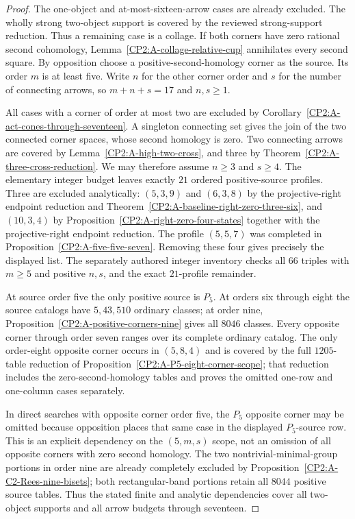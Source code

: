 \begin{proof}
The one-object and at-most-sixteen-arrow cases are already
excluded. The wholly strong two-object support is covered
by the reviewed strong-support reduction. Thus a remaining
case is a collage. If both corners have zero rational
second cohomology, Lemma~\ref{CP2:A-collage-relative-cup}
annihilates every second square. By opposition choose a
positive-second-homology corner as the source. Its order
$m$ is at least five. Write $n$ for the other corner order
and $s$ for the number of connecting arrows, so
$m+n+s=17$ and $n,s\geq1$.

All cases with a corner of order at most two are excluded
by Corollary~\ref{CP2:A-act-cones-through-seventeen}.
A singleton connecting set gives the join of the two
connected corner spaces, whose second homology is zero.
Two connecting arrows are covered by
Lemma~\ref{CP2:A-high-two-cross}, and three by
Theorem~\ref{CP2:A-three-cross-reduction}.
We may therefore assume $n\geq3$ and $s\geq4$.
The elementary integer budget leaves exactly $21$ ordered
positive-source profiles. Three are excluded analytically:
$(5,3,9)$ and $(6,3,8)$ by the projective-right endpoint
reduction and Theorem~\ref{CP2:A-baseline-right-zero-three-six},
and $(10,3,4)$ by
Proposition~\ref{CP2:A-right-zero-four-states} together
with the projective-right endpoint reduction. The profile
$(5,5,7)$ was completed in
Proposition~\ref{CP2:A-five-five-seven}. Removing these
four gives precisely the displayed list.
The separately authored integer inventory
 checks all
$66$ triples with $m\geq5$ and positive $n,s$, and the
exact $21$-profile remainder.

At source order five the only positive source is $P_5$.
At orders six through eight the source catalogs have
$5,43,510$ ordinary classes; at order nine,
Proposition~\ref{CP2:A-positive-corners-nine} gives all
$8046$ classes. Every opposite corner through order seven
ranges over its complete ordinary catalog. The only
order-eight opposite corner occurs in $(5,8,4)$ and is
covered by the full $1205$-table reduction of
Proposition~\ref{CP2:A-P5-eight-corner-scope}; that reduction
includes the zero-second-homology tables and proves the
omitted one-row and one-column cases separately.

In direct searches with opposite corner order five,
the $P_5$ opposite corner may be omitted because opposition
places that same case in the displayed $P_5$-source row.
This is an explicit dependency on the $(5,m,s)$ scope,
not an omission of all opposite corners with zero second
homology. The two nontrivial-minimal-group portions in
order nine are already completely excluded by
Proposition~\ref{CP2:A-C2-Rees-nine-bisets}; both rectangular-band
portions retain all $8044$ positive source tables.
Thus the stated finite and analytic dependencies cover
all two-object supports and all arrow budgets through
seventeen.
\end{proof}

